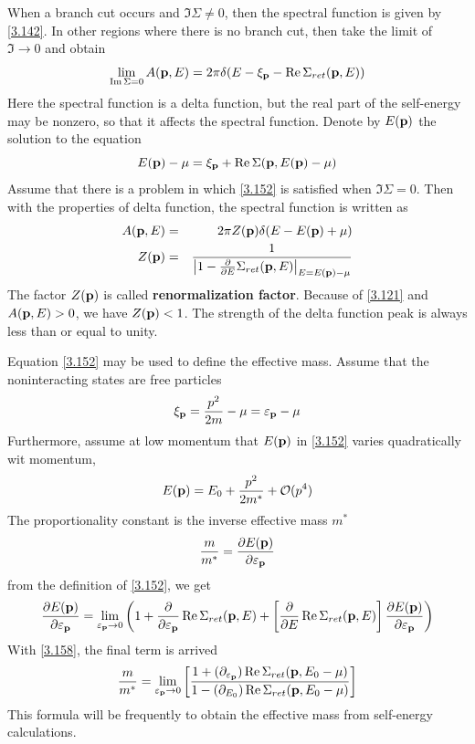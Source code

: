 When a branch cut occurs and $\Im\Sigma \neq 0$, then the spectral function is given by \eqref{3.142}.
In other regions where there is no branch cut, then take the limit of $\Im\to 0$ and obtain
\begin{equation}
  \lim_{\Im\Sigma=0}A(\mathbf{p},E)=2\pi \delta(E-\xi_{\mathbf{p}}-\Re\Sigma_{ret}(\mathbf{p},E))   \label{3.151}
\end{equation}
Here the spectral function is a delta function, but the real part of the self-energy may be nonzero, so that it affects the spectral function.
Denote by $E(\mathbf{p})$ the solution to the equation
\begin{equation}
  E(\mathbf{p}) -\mu = \xi_{\mathbf{p}} + \Re\Sigma(\mathbf{p},E(\mathbf{p})-\mu) \label{3.152}
\end{equation}
Assume that there is a problem in which \eqref{3.152} is satisfied when $\Im\Sigma=0$.
Then with the properties of delta function, the spectral function is written as
\begin{eqnarray}
  A(\mathbf{p},E)&=&2\pi Z(\mathbf{p}) \delta(E-E(\mathbf{p})+\mu) \label{3.154} \\
  Z(\mathbf{p})&=&\frac{1}{\abs{1- \frac{\partial}{\partial E} \Sigma_{ret}(\mathbf{p},E)}_{E=E(\mathbf{p})-\mu}}  \label{3.155}
\end{eqnarray}
The factor $Z(\mathbf{p})$ is called \textbf{renormalization factor}.
Because of \eqref{3.121} and $A(\mathbf{p},E)>0$, we have $Z(\mathbf{p})<1$.
The strength of the delta function peak is always less than or equal to unity.

Equation \eqref{3.152} may be used to define the effective mass. Assume that the noninteracting states are free particles
\begin{equation}
  \xi_{\mathbf{p}} = \frac{p^2}{2m} -\mu = \varepsilon_{\mathbf{p}} -\mu  \label{3.156}
\end{equation}
Furthermore, assume at low momentum that $E(\mathbf{p})$ in \eqref{3.152} varies quadratically wit momentum,
\begin{equation}
  E(\mathbf{p}) = E_0 + \frac{p^2}{2m^*} +\mathcal{O}(p^4)  \label{3.157}
\end{equation}
The proportionality constant is the inverse effective mass $m^*$
\begin{equation}
  \frac{m}{m^*} = \frac{\partial E(\mathbf{p})}{\partial \varepsilon_{\mathbf{p}}}  \label{3.158}
\end{equation}
from the definition of \eqref{3.152}, we get
\begin{equation}
  \frac{\partial E(\mathbf{p})}{\partial \varepsilon_{\mathbf{p}}} = \lim_{\varepsilon_{\mathbf{p}} \to 0} \left(1 + \frac{\partial}{\partial \varepsilon_{\mathbf{p}}} \Re\Sigma_{ret}(\mathbf{p},E) + \left[ \frac{\partial}{\partial E}\Re\Sigma_{ret}(\mathbf{p},E) \right] \frac{\partial E(\mathbf{p}) }{\partial \varepsilon_{\mathbf{p}}} \right)  \label{3.159}
\end{equation}
With \eqref{3.158}, the final term is arrived
\begin{equation}
  \frac{m}{m^*} = \lim_{\varepsilon_{\mathbf{p}} \to 0} \left[ \frac{1 + (\partial_{\varepsilon_{\mathbf{p}}}) \Re \Sigma_{ret}(\mathbf{p},E_0-\mu)}{1 - (\partial_{E_0}) \Re \Sigma_{ret}(\mathbf{p},E_0-\mu)}\right]  \label{3.160}
\end{equation}
This formula will be frequently to obtain the effective mass from self-energy calculations.

